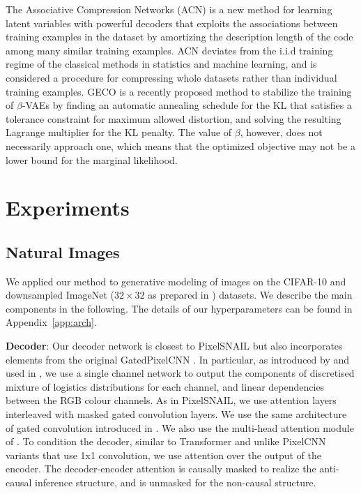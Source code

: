 \documentclass{article} \usepackage{iclr2019_conference,times}
\newcommand{\aref}[1]{Appendix~\ref{#1}}
\begin{document}
The Associative Compression Networks (ACN) \citep{ACN} is a new method for learning latent variables with powerful decoders that exploits the associations between training examples in the dataset by amortizing the description length of the code among many similar training examples. ACN deviates from the i.i.d training regime of the classical methods in statistics and machine learning, and is considered a procedure for compressing whole datasets rather than individual training examples. GECO \citep{Geco} is a recently proposed method to stabilize the training of $\beta$-VAEs by finding an automatic
annealing schedule for the KL that satisfies a tolerance constraint for maximum allowed distortion, and solving the resulting Lagrange multiplier for the KL penalty. The value of $\beta$, however, does not necessarily approach one, which means that the optimized objective may not be a lower bound for the marginal likelihood. \section{Experiments}\label{sec:exp}

\subsection{Natural Images}
We applied our method to generative modeling of images on the CIFAR-10 \citep{cifar10} and downsampled ImageNet \citep{imagenet} ($32\times 32$ as prepared in \cite{PixelRNN}) datasets. We describe the main components in the following. The details of our hyperparameters can be found in \aref{app:arch}.

\textbf{Decoder}: Our decoder network is closest to PixelSNAIL \citep{PixelSnail} but also incorporates elements from the original GatedPixelCNN \citep{pixelcnn}. In particular, as introduced by \cite{PixelCNN++} and used in \cite{PixelSnail}, we use a single channel network to output the components of discretised mixture of logistics distributions for each channel, and linear dependencies between the RGB colour channels. As in PixelSNAIL, we use attention layers interleaved with masked gated convolution layers. We use the same architecture of gated convolution introduced in \cite{pixelcnn}. We also use the multi-head attention module of \cite{Vaswani2017}. To condition the decoder, similar to Transformer and unlike PixelCNN variants that use 1x1 convolution,  we use attention over the output of the encoder. The decoder-encoder attention is causally masked to realize the anti-causal inference structure, and is unmasked for the non-causal structure. 
\end{document}
